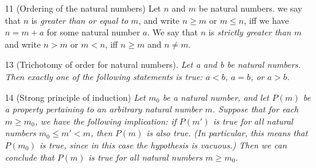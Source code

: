 \begin{definition}{11}
    \label{nat-order}
    (Ordering of the natural numbers) Let $n$ and $m$ be natural numbers. we say that $n$ is \emph{greater than or equal to} $m$, and write $n \geq m$ or $m \leq n$, iff we have $n = m + a$ for some natural number $a$. We say that $n$ is \emph{strictly greater than $m$} and write $n > m$ or $m < n$, iff $n \geq m$ and $n \neq m$.
\end{definition}


\begin{proposition}{13}
    \label{nat-trichotomy}
    (Trichotomy of order for natural numbers). \emph{Let a and b be natural numbers. Then exactly one of the following statements is true: $a<b$, $a=b$, or $a>b$.}
\end{proposition}

\begin{proposition}{14}
    \label{strong-induction}
    (Strong principle of induction) \emph{Let $m_0$ be a natural number, and let $P(m)$ be a property pertaining to an arbitrary natural number $m$. Suppose that for each $m\geq m_0$, we have the following implication: if $P(m')$ is true for all natural numbers $m_0 \leq m' < m$, then $P(m)$ is also true. (In particular, this means that $P(m_0)$ is true, since in this case the hypothesis is vacuous.) Then we can conclude that $P(m)$ is true for all natural numbers $m \geq m_0$.}
\end{proposition}

